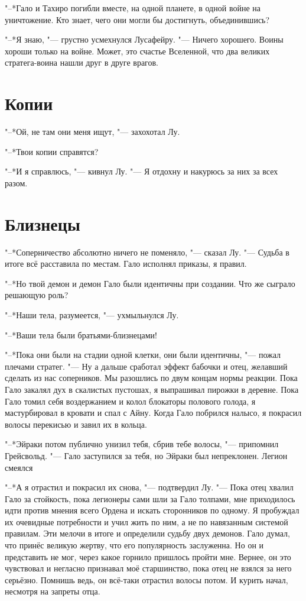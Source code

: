 \documentclass[a4paper,10pt]{book}
\newcommand{\ldotst}{\so{...}\xspace}
\begin{document}
"--*Гало и Тахиро погибли вместе, на одной планете, в одной войне на 
уничтожение. Кто знает, чего они могли бы достигнуть, объединившись?

"--*Я знаю, "--- грустно усмехнулся Лусафейру. "--- Ничего хорошего. Воины 
хороши только на войне. Может, это счастье Вселенной, что два великих 
стратега-воина нашли друг в друге врагов.

\section{Копии}

"--*Ой, не там они меня ищут, "--- захохотал Лу.

"--*Твои копии справятся?

"--*И я справлюсь, "--- кивнул Лу. "--- Я отдохну и накурюсь за них за всех разом.

\section{Близнецы}

"--*Соперничество абсолютно ничего не поменяло, "--- сказал Лу. "--- Судьба в итоге всё расставила по местам. Гало исполнял приказы, я правил.

"--*Но твой демон и демон Гало были идентичны при создании. Что же сыграло решающую роль?

"--*Наши тела, разумеется, "--- ухмыльнулся Лу.

"--*Ваши тела были братьями-близнецами!

"--*Пока они были на стадии одной клетки, они были идентичны, "--- пожал плечами стратег. "--- Ну а дальше сработал эффект бабочки и отец, желавший сделать из нас соперников. Мы разошлись по двум концам нормы реакции. Пока Гало закалял дух в скалистых пустошах, я выпрашивал пирожки в деревне. Пока Гало томил себя воздержанием и колол блокаторы полового голода, я мастурбировал в кровати и спал с Айну. Когда Гало побрился налысо, я покрасил волосы перекисью и завил их в кольца.

"--*Эйраки потом публично унизил тебя, сбрив тебе волосы, "--- припомнил Грейсвольд. "--- Гало заступился за тебя, но Эйраки был непреклонен. Легион смеялся\ldotst

"--*А я отрастил и покрасил их снова, "--- подтвердил Лу. "--- Пока отец хвалил Гало за стойкость, пока легионеры сами шли за Гало толпами, мне приходилось идти против мнения всего Ордена и искать сторонников по одному. Я пробуждал их очевидные потребности и учил жить по ним, а не по навязанным системой правилам. Эти мелочи в итоге и определили судьбу двух демонов. Гало думал, что принёс великую жертву, что его популярность заслуженна. Но он и представить не мог, через какое горнило пришлось пройти мне. Вернее, он это чувствовал и негласно признавал моё старшинство, пока отец не взялся за него серьёзно. Помнишь ведь, он всё-таки отрастил волосы потом. И курить начал, несмотря на запреты отца.
\end{document}
